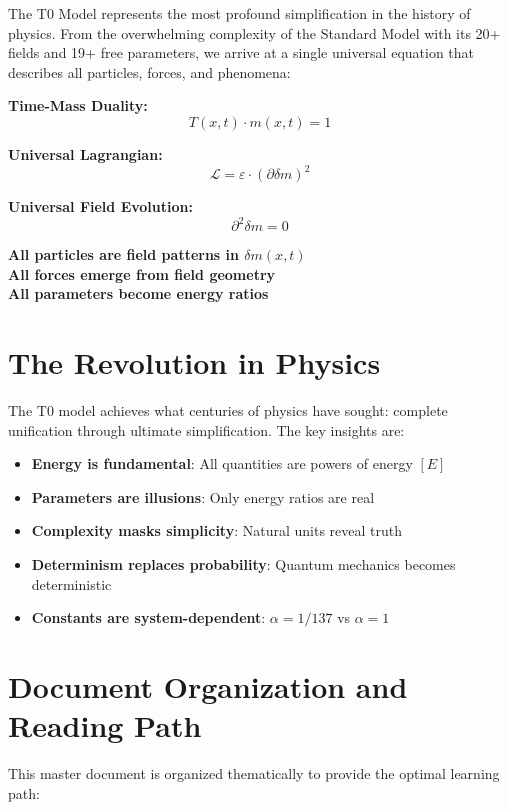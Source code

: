 \documentclass[12pt,a4paper]{report}
\begin{document}
	The T0 Model represents the most profound simplification in the history of physics. From the overwhelming complexity of the Standard Model with its 20+ fields and 19+ free parameters, we arrive at a single universal equation that describes all particles, forces, and phenomena:
	
	\begin{tcolorbox}[colback=blue!5!white,colframe=blue!75!black,title=The Universal T0 Framework]
		\textbf{Time-Mass Duality:} 
		$$T(x,t) \cdot m(x,t) = 1$$
		
		\textbf{Universal Lagrangian:}
		$$\mathcal{L} = \varepsilon \cdot (\partial \delta m)^2$$
		
		\textbf{Universal Field Evolution:}
		$$\partial^2 \delta m = 0$$
		
		\textbf{All particles are field patterns in $\delta m(x,t)$}\\
		\textbf{All forces emerge from field geometry}\\
		\textbf{All parameters become energy ratios}
	\end{tcolorbox}
	
	\section{The Revolution in Physics}
	
	The T0 model achieves what centuries of physics have sought: complete unification through ultimate simplification. The key insights are:
	
	\begin{itemize}
		\item \textbf{Energy is fundamental}: All quantities are powers of energy $[E]$
		\item \textbf{Parameters are illusions}: Only energy ratios are real
		\item \textbf{Complexity masks simplicity}: Natural units reveal truth
		\item \textbf{Determinism replaces probability}: Quantum mechanics becomes deterministic
		\item \textbf{Constants are system-dependent}: $\alpha = 1/137$ vs $\alpha = 1$
	\end{itemize}
	
	\section{Document Organization and Reading Path}
	
	This master document is organized thematically to provide the optimal learning path:
	
\end{document}
